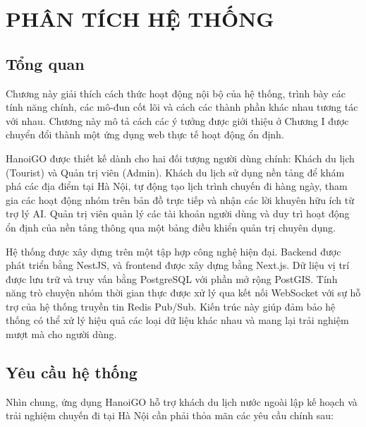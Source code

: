 \documentclass[a4paper,12pt]{report}
\begin{document}
\setlength{\parindent}{15pt}
\setlength{\parskip}{0em}
\linespread{1}\selectfont

\chapter{PHÂN TÍCH HỆ THỐNG}

\setlength{\parindent}{0pt}
\setlength{\parskip}{0.6em}
\linespread{1.3}\selectfont
\titlespacing*{\section}{0pt}{12pt}{4pt}

\section{Tổng quan}

Chương này giải thích cách thức hoạt động nội bộ của hệ thống, trình bày các tính năng chính, các mô-đun cốt lõi và cách các thành phần khác nhau tương tác với nhau. Chương này mô tả cách các ý tưởng được giới thiệu ở Chương I được chuyển đổi thành một ứng dụng web thực tế hoạt động ổn định.

HanoiGO được thiết kế dành cho hai đối tượng người dùng chính: Khách du lịch (Tourist) và Quản trị viên (Admin). Khách du lịch sử dụng nền tảng để khám phá các địa điểm tại Hà Nội, tự động tạo lịch trình chuyến đi hàng ngày, tham gia các hoạt động nhóm trên bản đồ trực tiếp và nhận các lời khuyên hữu ích từ trợ lý AI. Quản trị viên quản lý các tài khoản người dùng và duy trì hoạt động ổn định của nền tảng thông qua một bảng điều khiển quản trị chuyên dụng.

Hệ thống được xây dựng trên một tập hợp công nghệ hiện đại. Backend được phát triển bằng NestJS, và frontend được xây dựng bằng Next.js. Dữ liệu vị trí được lưu trữ và truy vấn bằng PostgreSQL với phần mở rộng PostGIS. Tính năng trò chuyện nhóm thời gian thực được xử lý qua kết nối WebSocket với sự hỗ trợ của hệ thống truyền tin Redis Pub/Sub. Kiến trúc này giúp đảm bảo hệ thống có thể xử lý hiệu quả các loại dữ liệu khác nhau và mang lại trải nghiệm mượt mà cho người dùng.

\section{Yêu cầu hệ thống}

Nhìn chung, ứng dụng HanoiGO hỗ trợ khách du lịch nước ngoài lập kế hoạch và trải nghiệm chuyến đi tại Hà Nội cần phải thỏa mãn các yêu cầu chính sau:
\end{document}
